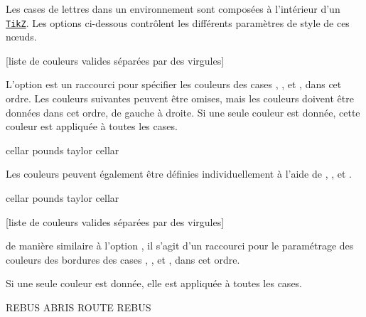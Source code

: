 \documentclass[svgnames]{report}
\newcommand\ctan[1]{\href{https://www.ctan.org/pkg/#1}{\texttt{#1}}}
\begin{document}
  Les cases de lettres dans un environnement  sont composées à l'intérieur
  d'un \keyword{\node} \ctan{TikZ}. Les options ci-dessous contrôlent les
  différents paramètres de style de ces nœuds.
  
  [liste de couleurs valides séparées par des virgules]
  
  L'option  est un raccourci pour spécifier les
  couleurs des cases , ,  et
  , dans cet ordre. Les couleurs suivantes peuvent être omises, mais
  les couleurs doivent être données dans cet ordre, de gauche à droite.
  Si une seule couleur est donnée, cette couleur est appliquée à toutes les cases.

  \begin{example}
  \begin{wordle}[Couleurs={LightGray,Orange,Teal}]{cellar}
    pounds
    taylor
    cellar
  \end{wordle}
  \end{example}

  Les couleurs peuvent également être définies individuellement à l'aide de , ,  et .

  \begin{example}
  \begin{wordle}[couleur absent=DarkGray,couleur present=Salmon,
                 couleur correct=SeaGreen]{cellar}
    pounds
    taylor
    cellar
  \end{wordle}
  \end{example}

  [liste de couleurs valides séparées par des virgules]

  de manière similaire à l'option  , il s'agit d'un raccourci pour le paramétrage des couleurs des bordures des cases , ,
   et , dans cet ordre.
  
  Si une seule couleur est donnée, elle est appliquée à toutes les cases.

  \begin{example}
  \begin{wordle}[CouleurBordures={red,orange,blue}]{REBUS}
    ABRIS
    ROUTE
    REBUS
  \end{wordle}
  \end{example}
\end{document}

